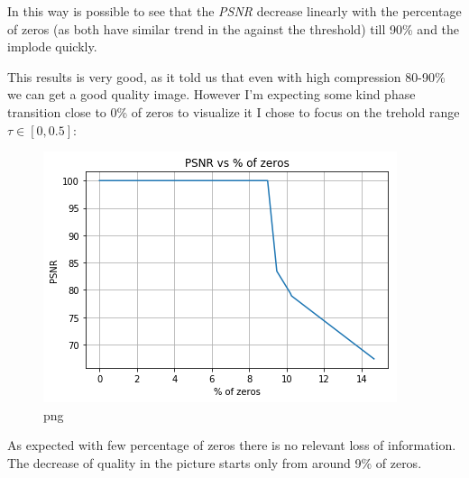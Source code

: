 \documentclass{letter}
\newcommand{\tmem}[1]{{\em #1\/}}
\begin{document}
In this way is possible to see that the {\tmem{PSNR}} decrease linearly with
the percentage of zeros (as both have similar trend in the against the
threshold) till 90\% and the implode quickly.

This results is very good, as it told us that even with high compression
80-90\% we can get a good quality image. However I'm expecting some kind phase
transition close to 0\% of zeros to visualize it I chose to focus on the
trehold range $\tau \in [0, 0.5]$:

\begin{figure}[h]
  \begin{center}
    \includegraphics{output_21_0.png} 
  \end{center}
  \caption{png}
\end{figure}

As expected with few percentage of zeros there is no relevant loss of
information. The decrease of quality in the picture starts only from around
9\% of zeros.
\end{document}
